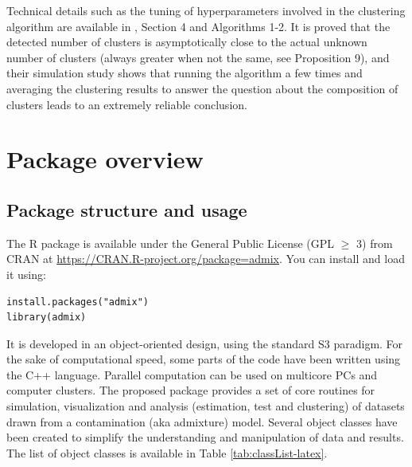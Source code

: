 Technical details such as the tuning of hyperparameters involved in the clustering algorithm are available in \citet{Milhaud+Pommeret+Salhi+Vandekerkhove:2024b}, Section 4 and Algorithms 1-2. It is proved that the detected number of clusters is asymptotically close to the actual unknown number of clusters (always greater when not the same, see Proposition 9), and their simulation study shows that running the algorithm a few times and averaging the clustering results to answer the question about the composition of clusters leads to an extremely reliable conclusion.

\section{Package overview}\label{sec:overview}

\subsection{Package structure and usage}\label{package-structure-and-usage}

The R package  is available under the General Public License (GPL \(\geq\) 3) from CRAN at \url{https://CRAN.R-project.org/package=admix}. You can install and load it using:

\begin{verbatim}
install.packages("admix")
library(admix)
\end{verbatim}

It is developed in an object-oriented design, using the standard S3 paradigm. For the sake of computational speed, some parts of the code have been written using the C++ language. Parallel computation can be used on multicore PCs and computer clusters. The proposed package provides a set of core routines for simulation, visualization and analysis (estimation, test and clustering) of datasets drawn from a contamination (aka admixture) model. Several object classes have been created to simplify the understanding and manipulation of data and results. The list of object classes is available in Table \ref{tab:classList-latex}.


